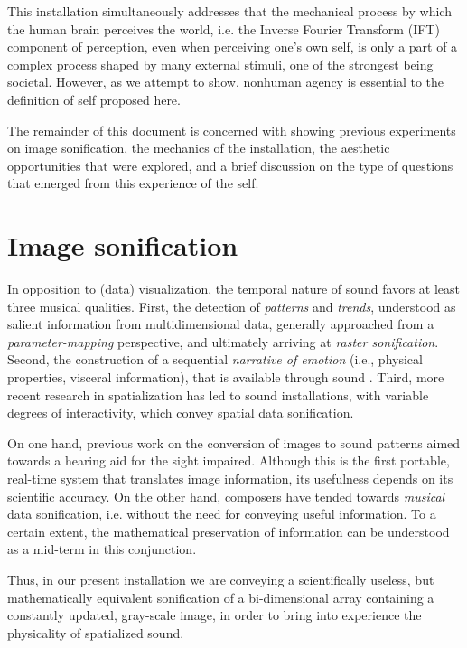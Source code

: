 \documentclass{nime-alternate}
\begin{document}
This installation simultaneously addresses that the mechanical process by which the human brain perceives the world, i.e. the Inverse Fourier Transform (IFT) component of perception, even when perceiving one's own self, is only a part of a complex process shaped by many external stimuli, one of the strongest being societal. However, as we attempt to show, nonhuman agency is essential to the definition of self proposed here.

The remainder of this document is concerned with showing previous experiments on image sonification, the mechanics of the installation, the aesthetic opportunities that were explored, and a brief discussion on the type of questions that emerged from this experience of the self.

\section{Image sonification}

In opposition to (data) visualization, the temporal nature of sound favors at least three musical qualities. First, the detection of \textit{patterns} and \textit{trends}, understood as salient information from multidimensional data\cite{bental:sonification,bental:sonification2}, generally approached from a \textit{parameter-mapping} perspective\cite{kramer:principles,bental:sonart,yeo:framework}, and ultimately arriving at \textit{raster sonification}\cite{yeo:raster}. Second, the construction of a sequential \textit{narrative of emotion} (i.e., physical properties, visceral information), that is available through sound \cite{polli:sonification}. Third, more recent research in spatialization has led to sound installations, with variable degrees of interactivity, which convey spatial data sonification\cite{weinberg:brainwaves}. 

On one hand, previous work on the conversion of images to sound patterns aimed towards a hearing aid for the sight impaired\cite{meijer:auditory}. Although this is the first portable, real-time system that translates image information, its usefulness depends on its scientific accuracy. On the other hand, composers have tended towards \textit{musical} data sonification, i.e. without the need for conveying useful information\cite{bental:sonification,bental:sonification2}. To a certain extent, the mathematical preservation of information can be understood as a mid-term in this conjunction\cite{thiebaut:images}. 

Thus, in our present installation we are conveying a scientifically useless, but mathematically equivalent sonification of a bi-dimensional array containing a constantly updated, gray-scale image, in order to bring into experience the physicality of spatialized sound.
\end{document}
